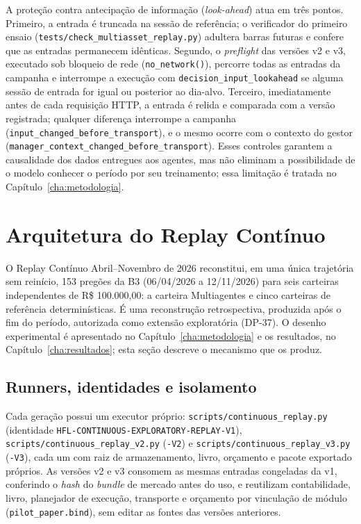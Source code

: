 \documentclass{eic-bcc-tcc}
\begin{document}
A proteção contra antecipação de informação (\textit{look-ahead}) atua em três pontos. Primeiro, a entrada é truncada na sessão de referência; o verificador do primeiro ensaio (\texttt{tests/check\_multiasset\_replay.py}) adultera barras futuras e confere que as entradas permanecem idênticas. Segundo, o \textit{preflight} das versões v2 e v3, executado sob bloqueio de rede (\texttt{no\_network()}), percorre todas as entradas da campanha e interrompe a execução com \texttt{decision\_input\_lookahead} se alguma sessão de entrada for igual ou posterior ao dia-alvo. Terceiro, imediatamente antes de cada requisição HTTP, a entrada é relida e comparada com a versão registrada; qualquer diferença interrompe a campanha (\texttt{input\_changed\_before\_transport}), e o mesmo ocorre com o contexto do gestor (\texttt{manager\_context\_changed\_before\_transport}). Esses controles garantem a causalidade dos dados entregues aos agentes, mas não eliminam a possibilidade de o modelo conhecer o período por seu treinamento; essa limitação é tratada no Capítulo~\ref{cha:metodologia}.

\section{Arquitetura do Replay Contínuo}
\label{sec:arq-replay}

O Replay Contínuo Abril--Novembro de 2026 reconstitui, em uma única trajetória sem reinício, 153 pregões da B3 (06/04/2026 a 12/11/2026) para seis carteiras independentes de R\$ 100.000,00: a carteira Multiagentes e cinco carteiras de referência determinísticas. É uma reconstrução retrospectiva, produzida após o fim do período, autorizada como extensão exploratória (DP-37). O desenho experimental é apresentado no Capítulo~\ref{cha:metodologia} e os resultados, no Capítulo~\ref{cha:resultados}; esta seção descreve o mecanismo que os produz.

\subsection{Runners, identidades e isolamento}

Cada geração possui um executor próprio: \texttt{scripts/continuous\_replay.py} (identidade \texttt{HFL-CONTINUOUS-EXPLORATORY-REPLAY-V1}), \texttt{scripts/continuous\_replay\_v2.py} (\texttt{-V2}) e \texttt{scripts/continuous\_replay\_v3.py} (\texttt{-V3}), cada um com raiz de armazenamento, livro, orçamento e pacote exportado próprios. As versões v2 e v3 consomem as mesmas entradas congeladas da v1, conferindo o \textit{hash} do \textit{bundle} de mercado antes do uso, e reutilizam contabilidade, livro, planejador de execução, transporte e orçamento por vinculação de módulo (\texttt{pilot\_paper.bind}), sem editar as fontes das versões anteriores.
\end{document}

